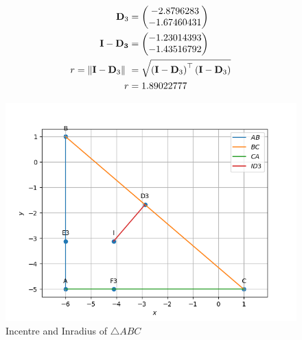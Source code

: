 \documentclass[11pt]{book}
\begin{document}
\begin{enumerate}[label=\thesection.\arabic*.,ref=\thesection.\theenumi]
\begin{enumerate}
\begin{align}
       \vec{D}_3 &= \myvec{-2.8796283  \\ -1.67460431} \\
       \vec{I - D_3} &= \myvec{-1.23014393 \\-1.43516792} \\
 r= \norm{\vec{I}-\vec{D}_3}\ &=  \sqrt{\brak{\vec{I}-\vec{D}_3}^{\top}\brak{\vec{I}-\vec{D}_3}} \\
 r &= 1.89022777
   \end{align}
\end{enumerate}
\begin{figure}[H]
\includegraphics[width=\columnwidth]{figs/Incentre.png}
\caption{Incentre and Inradius of $\triangle ABC$}
\label{fig:fig2}
\end{figure}


\end{enumerate}
\end{document}
